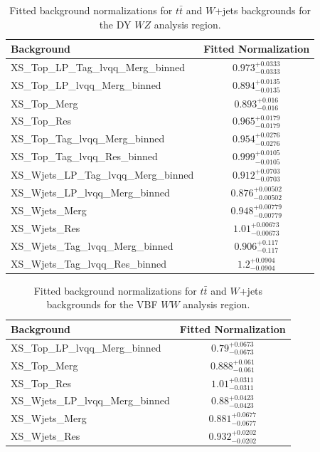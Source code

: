 \begin{table}
\begin{tabular}{|l|c|}
\hline
Background & Fitted Normalization \\\hline
XS\_Top\_LP\_Tag\_lvqq\_Merg\_binned & $0.973^{+0.0333}_{-0.0333}$ \\\hline
XS\_Top\_LP\_lvqq\_Merg\_binned & $0.894^{+0.0135}_{-0.0135}$ \\\hline
XS\_Top\_Merg & $0.893^{+0.016}_{-0.016}$ \\\hline
XS\_Top\_Res & $0.965^{+0.0179}_{-0.0179}$ \\\hline
XS\_Top\_Tag\_lvqq\_Merg\_binned & $0.954^{+0.0276}_{-0.0276}$ \\\hline
XS\_Top\_Tag\_lvqq\_Res\_binned & $0.999^{+0.0105}_{-0.0105}$ \\\hline
XS\_Wjets\_LP\_Tag\_lvqq\_Merg\_binned & $0.912^{+0.0703}_{-0.0703}$ \\\hline
XS\_Wjets\_LP\_lvqq\_Merg\_binned & $0.876^{+0.00502}_{-0.00502}$ \\\hline
XS\_Wjets\_Merg & $0.948^{+0.00779}_{-0.00779}$ \\\hline
XS\_Wjets\_Res & $1.01^{+0.00673}_{-0.00673}$ \\\hline
XS\_Wjets\_Tag\_lvqq\_Merg\_binned & $0.906^{+0.117}_{-0.117}$ \\\hline
XS\_Wjets\_Tag\_lvqq\_Res\_binned & $1.2^{+0.0904}_{-0.0904}$ \\\hline
\end{tabular}
\caption{Fitted background normalizations for $t\bar{t}$ and $W$+jets backgrounds for the DY $WZ$ analysis region.}
\label{tbl:hvtwz_norm}
\end{table}


\begin{table}
\begin{tabular}{|l|c|}
\hline
Background & Fitted Normalization \\\hline
XS\_Top\_LP\_lvqq\_Merg\_binned & $0.79^{+0.0673}_{-0.0673}$ \\\hline
XS\_Top\_Merg & $0.888^{+0.061}_{-0.061}$ \\\hline
XS\_Top\_Res & $1.01^{+0.0311}_{-0.0311}$ \\\hline
XS\_Wjets\_LP\_lvqq\_Merg\_binned & $0.88^{+0.0423}_{-0.0423}$ \\\hline
XS\_Wjets\_Merg & $0.881^{+0.0677}_{-0.0677}$ \\\hline
XS\_Wjets\_Res & $0.932^{+0.0202}_{-0.0202}$ \\\hline
\end{tabular}
\caption{Fitted background normalizations for $t\bar{t}$ and $W$+jets backgrounds for the VBF $WW$ analysis region.}
\label{tbl:hvtwwvbf_norm}
\end{table}

